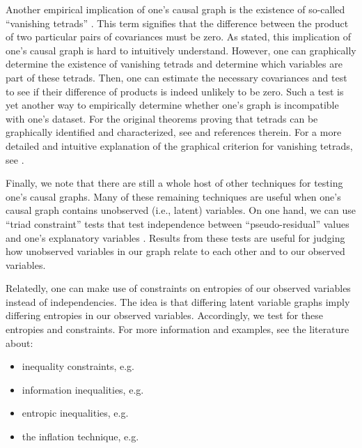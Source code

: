 Another empirical implication of one's causal graph is the existence of so-called ``vanishing tetrads'' \citep{spearman_1904_general}.
This term signifies that the difference between the product of two particular pairs of covariances must be zero.
As stated, this implication of one's causal graph is hard to intuitively understand.
However, one can graphically determine the existence of vanishing tetrads and determine which variables are part of these tetrads.
Then, one can estimate the necessary covariances and test to see if their difference of products is indeed unlikely to be zero.
Such a test is yet another way to empirically determine whether one's graph is incompatible with one's dataset.
For the original theorems proving that tetrads can be graphically identified and characterized, see \citet{shafer_1996_vanishing} and references therein.
For a more detailed and intuitive explanation of the graphical criterion for vanishing tetrads, see \citet{thoemmes_2018_local}.

Finally, we note that there are still a whole host of other techniques for testing one's causal graphs.
Many of these remaining techniques are useful when one's causal graph contains unobserved (i.e., latent) variables.
On one hand, we can use ``triad constraint'' tests that test independence between ``pseudo-residual'' values and one's explanatory variables \citep{cai_2019_triad}.
Results from these tests are useful for judging how unobserved variables in our graph relate to each other and to our observed variables.

Relatedly, one can make use of constraints on entropies of our observed variables instead of independencies.
The idea is that differing latent variable graphs imply differing entropies in our observed variables.
Accordingly, we test for these entropies and constraints.
For more information and examples, see the literature about:
\begin{itemize}
  \item inequality constraints, e.g. \citet{tian_2002_testable, kang_2006_inequality, ver_2011_sequence}
  \item information inequalities, e.g. \citet{chaves_2014_inferring}
  \item entropic inequalities, e.g. \citet{chaves_2014_causal}
  \item the inflation technique, e.g. \citet{wolfe_2019_inflation, navascues_2020_inflation}
\end{itemize}
